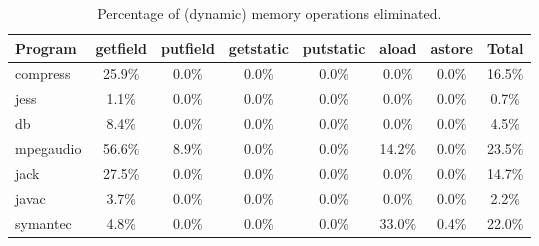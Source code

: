 \begin{table}
\begin{center}
\begin{tabular}{||l|c|c|c|c|c|c||c||}			\hline
{\bf Program}				&
{\bf getfield}				&
{\bf putfield}				&
{\bf getstatic}				&
{\bf putstatic}				&
{\bf aload}				&
{\bf astore}				&
{\bf Total}				\\ \hline
%

compress & 25.9\% & 0.0\% & 0.0\% & 0.0\% & 0.0\% & 0.0\% & 16.5\% \\
jess & 1.1\% & 0.0\% & 0.0\% & 0.0\% & 0.0\% & 0.0\% & 0.7\% \\
db & 8.4\% & 0.0\% & 0.0\% & 0.0\% & 0.0\% & 0.0\% & 4.5\% \\
mpegaudio & 56.6\% & 8.9\% & 0.0\% & 0.0\% & 14.2\% & 0.0\% & 23.5\% \\
jack & 27.5\% & 0.0\% & 0.0\% & 0.0\% & 0.0\% & 0.0\% & 14.7\% \\
javac & 3.7\% & 0.0\% & 0.0\% & 0.0\% & 0.0\% & 0.0\% & 2.2\% \\
symantec & 4.8\% & 0.0\% & 0.0\% & 0.0\% & 33.0\% & 0.4\% & 22.0\%  \\ \hline

\end{tabular}
\end{center}
  \caption{Percentage of (dynamic) memory operations eliminated.}
  \label{table:counts}
\end{table}
